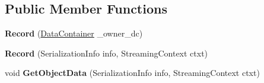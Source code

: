 \subsection*{Public Member Functions}
\begin{DoxyCompactItemize}
\item 
\hypertarget{class_dwarf_d_b_1_1_data_structures_1_1_record_ac6bae5700b3a08e9903a5c592d810de0}{{\bfseries Record} (\hyperlink{class_dwarf_d_b_1_1_data_structures_1_1_data_container}{Data\+Container} \+\_\+owner\+\_\+dc)}\label{class_dwarf_d_b_1_1_data_structures_1_1_record_ac6bae5700b3a08e9903a5c592d810de0}

\item 
\hypertarget{class_dwarf_d_b_1_1_data_structures_1_1_record_a184d66ff6a8abfd88fc08aec61635295}{{\bfseries Record} (Serialization\+Info info, Streaming\+Context ctxt)}\label{class_dwarf_d_b_1_1_data_structures_1_1_record_a184d66ff6a8abfd88fc08aec61635295}

\item 
\hypertarget{class_dwarf_d_b_1_1_data_structures_1_1_record_ac10ee5af7dc2c00f831de89d0ac6592e}{void {\bfseries Get\+Object\+Data} (Serialization\+Info info, Streaming\+Context ctxt)}\label{class_dwarf_d_b_1_1_data_structures_1_1_record_ac10ee5af7dc2c00f831de89d0ac6592e}


\end{DoxyCompactItemize}
